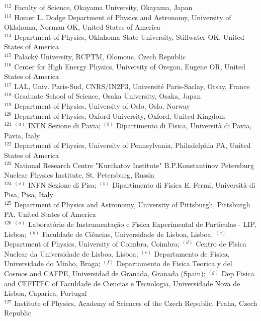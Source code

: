 \begin{flushleft}
$^{112}$ Faculty of Science, Okayama University, Okayama, Japan\\
$^{113}$ Homer L. Dodge Department of Physics and Astronomy, University of Oklahoma, Norman OK, United States of America\\
$^{114}$ Department of Physics, Oklahoma State University, Stillwater OK, United States of America\\
$^{115}$ Palack{\'y} University, RCPTM, Olomouc, Czech Republic\\
$^{116}$ Center for High Energy Physics, University of Oregon, Eugene OR, United States of America\\
$^{117}$ LAL, Univ. Paris-Sud, CNRS/IN2P3, Universit{\'e} Paris-Saclay, Orsay, France\\
$^{118}$ Graduate School of Science, Osaka University, Osaka, Japan\\
$^{119}$ Department of Physics, University of Oslo, Oslo, Norway\\
$^{120}$ Department of Physics, Oxford University, Oxford, United Kingdom\\
$^{121}$ $^{(a)}$ INFN Sezione di Pavia; $^{(b)}$ Dipartimento di Fisica, Universit{\`a} di Pavia, Pavia, Italy\\
$^{122}$ Department of Physics, University of Pennsylvania, Philadelphia PA, United States of America\\
$^{123}$ National Research Centre "Kurchatov Institute" B.P.Konstantinov Petersburg Nuclear Physics Institute, St. Petersburg, Russia\\
$^{124}$ $^{(a)}$ INFN Sezione di Pisa; $^{(b)}$ Dipartimento di Fisica E. Fermi, Universit{\`a} di Pisa, Pisa, Italy\\
$^{125}$ Department of Physics and Astronomy, University of Pittsburgh, Pittsburgh PA, United States of America\\
$^{126}$ $^{(a)}$ Laborat{\'o}rio de Instrumenta{\c{c}}{\~a}o e F{\'\i}sica Experimental de Part{\'\i}culas - LIP, Lisboa; $^{(b)}$ Faculdade de Ci{\^e}ncias, Universidade de Lisboa, Lisboa; $^{(c)}$ Department of Physics, University of Coimbra, Coimbra; $^{(d)}$ Centro de F{\'\i}sica Nuclear da Universidade de Lisboa, Lisboa; $^{(e)}$ Departamento de Fisica, Universidade do Minho, Braga; $^{(f)}$ Departamento de Fisica Teorica y del Cosmos and CAFPE, Universidad de Granada, Granada (Spain); $^{(g)}$ Dep Fisica and CEFITEC of Faculdade de Ciencias e Tecnologia, Universidade Nova de Lisboa, Caparica, Portugal\\
$^{127}$ Institute of Physics, Academy of Sciences of the Czech Republic, Praha, Czech Republic\\

\end{flushleft}
